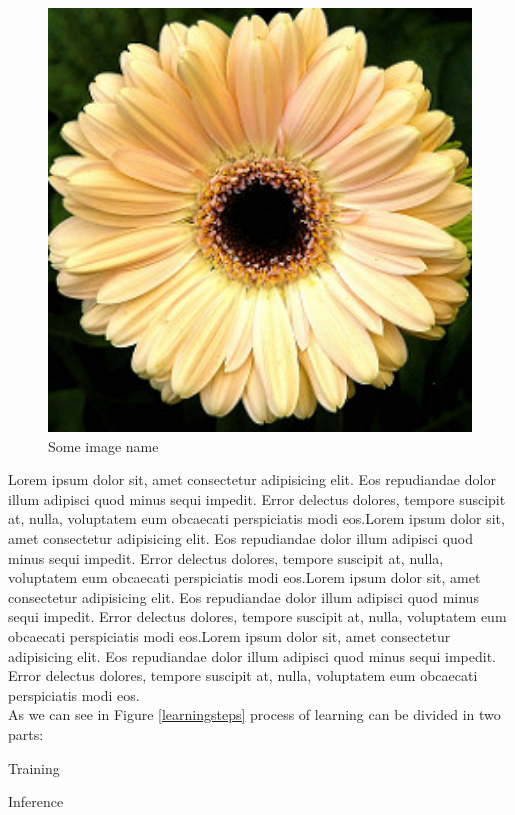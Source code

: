 \begin{figure}[h]
  \centering
  \includegraphics[width=13cm]{img/daisy}
  \caption{Some image name}\label{MLNNDL}
\end{figure}

 Lorem ipsum dolor sit, amet consectetur adipisicing elit. Eos repudiandae dolor illum adipisci quod minus sequi impedit. Error delectus dolores, tempore suscipit at, nulla, voluptatem eum obcaecati perspiciatis modi eos.Lorem ipsum dolor sit, amet consectetur adipisicing elit. Eos repudiandae dolor illum adipisci quod minus sequi impedit. Error delectus dolores, tempore suscipit at, nulla, voluptatem eum obcaecati perspiciatis modi eos.Lorem ipsum dolor sit, amet consectetur adipisicing elit. Eos repudiandae dolor illum adipisci quod minus sequi impedit. Error delectus dolores, tempore suscipit at, nulla, voluptatem eum obcaecati perspiciatis modi eos.Lorem ipsum dolor sit, amet consectetur adipisicing elit. Eos repudiandae dolor illum adipisci quod minus sequi impedit. Error delectus dolores, tempore suscipit at, nulla, voluptatem eum obcaecati perspiciatis modi eos.\\

As we can see in Figure \ref{learningsteps} process of learning can be divided in two parts:
\begin{tight_enumerate}
  \item Training
  \item Inference
\end{tight_enumerate}

